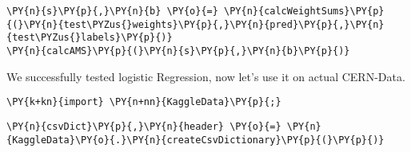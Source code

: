 {\par%
\vspace{-1\baselineskip}%
}%
\begin{notebookcell}[]%
\begin{addmargin}[\cellleftmargin]{0em}%
{\smaller%
\par%
%
\vspace{-1\smallerfontscale}%
\begin{Verbatim}[commandchars=\\\{\}]
\PY{n}{s}\PY{p}{,}\PY{n}{b} \PY{o}{=} \PY{n}{calcWeightSums}\PY{p}{(}\PY{n}{test\PYZus{}weights}\PY{p}{,}\PY{n}{pred}\PY{p}{,}\PY{n}{test\PYZus{}labels}\PY{p}{)}
\PY{n}{calcAMS}\PY{p}{(}\PY{n}{s}\PY{p}{,}\PY{n}{b}\PY{p}{)}
\end{Verbatim}
%
\par%
\vspace{-1\smallerfontscale}}%
\end{addmargin}
\end{notebookcell}


    We successfully tested logistic Regression, now let's use it on actual
CERN-Data.


{\par%
\vspace{-1\baselineskip}%
}%
\begin{notebookcell}[]%
\begin{addmargin}[\cellleftmargin]{0em}%
{\smaller%
\par%
%
\vspace{-1\smallerfontscale}%
\begin{Verbatim}[commandchars=\\\{\}]
\PY{k+kn}{import} \PY{n+nn}{KaggleData}\PY{p}{;}
\end{Verbatim}
%
\par%
\vspace{-1\smallerfontscale}}%
\end{addmargin}
\end{notebookcell}



{\par%
\vspace{-1\baselineskip}%
}%
\begin{notebookcell}[]%
\begin{addmargin}[\cellleftmargin]{0em}%
{\smaller%
\par%
%
\vspace{-1\smallerfontscale}%
\begin{Verbatim}[commandchars=\\\{\}]
\PY{n}{csvDict}\PY{p}{,}\PY{n}{header} \PY{o}{=} \PY{n}{KaggleData}\PY{o}{.}\PY{n}{createCsvDictionary}\PY{p}{(}\PY{p}{)}
\end{Verbatim}
%
\par%
\vspace{-1\smallerfontscale}}%
\end{addmargin}
\end{notebookcell}


